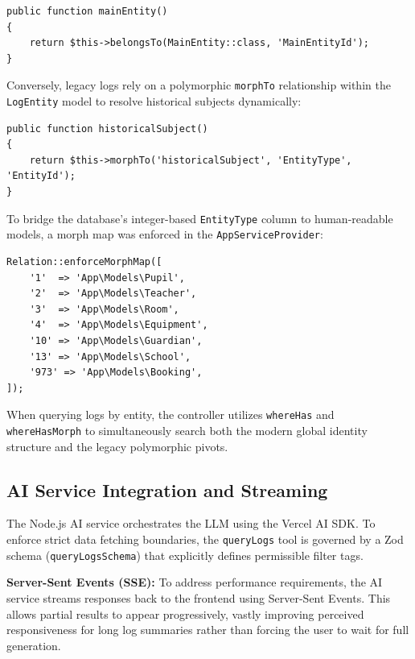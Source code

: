 \begin{verbatim}
public function mainEntity()
{
    return $this->belongsTo(MainEntity::class, 'MainEntityId');
}
\end{verbatim}

\begin{sloppypar}
    Conversely, legacy logs rely on a polymorphic \texttt{morphTo} relationship within the \texttt{LogEntity} model to resolve historical subjects dynamically:
\end{sloppypar}

\begin{verbatim}
public function historicalSubject()
{
    return $this->morphTo('historicalSubject', 'EntityType', 'EntityId');
}
\end{verbatim}

To bridge the database's integer-based \texttt{EntityType} column to human-readable models, a morph map was enforced in the \texttt{AppServiceProvider}:

\begin{verbatim}
Relation::enforceMorphMap([
    '1'  => 'App\Models\Pupil',
    '2'  => 'App\Models\Teacher',
    '3'  => 'App\Models\Room',
    '4'  => 'App\Models\Equipment',
    '10' => 'App\Models\Guardian',
    '13' => 'App\Models\School',
    '973' => 'App\Models\Booking',
]);
\end{verbatim}

When querying logs by entity, the controller utilizes \texttt{whereHas} and \texttt{whereHasMorph} to simultaneously search both the modern global identity structure and the legacy polymorphic pivots.

\subsection{AI Service Integration and Streaming}
\begin{sloppypar}
    The Node.js AI service orchestrates the LLM using the Vercel AI SDK. To enforce strict data fetching boundaries, the \texttt{queryLogs} tool is governed by a Zod schema (\texttt{queryLogsSchema}) that explicitly defines permissible filter tags.
\end{sloppypar}

\textbf{Server-Sent Events (SSE):} To address performance requirements, the AI service streams responses back to the frontend using Server-Sent Events. This allows partial results to appear progressively, vastly improving perceived responsiveness for long log summaries rather than forcing the user to wait for full generation.

